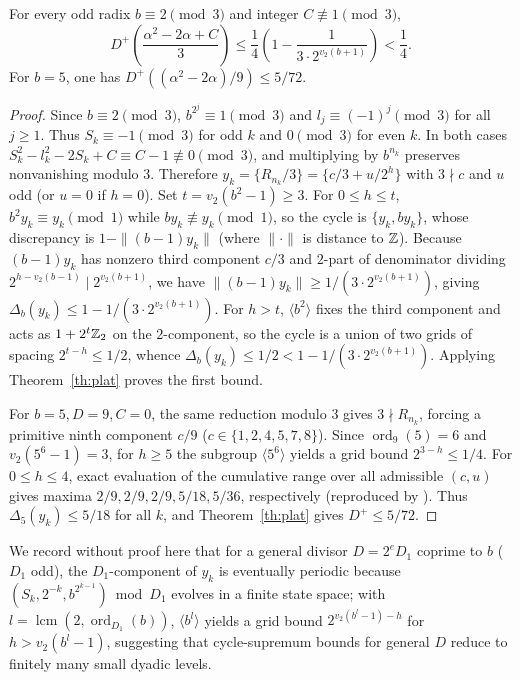 \documentclass[11pt]{article}
\begin{document}
\begin{corollary}\label{th:quarter}
For every odd radix $b\equiv2\pmod3$ and integer $C\not\equiv1\pmod3$,
\[
 D^+\!\left(\frac{\alpha^2-2\alpha+C}{3}\right)
 \le \frac14\left(1-\frac{1}{3\cdot2^{v_2(b+1)}}\right)<\frac14.
\]
For $b=5$, one has $D^+((\alpha^2-2\alpha)/9)\le5/72$.
\end{corollary}
\begin{proof}
Since $b\equiv2\pmod3$, $b^{2^j}\equiv1\pmod3$ and $l_j\equiv(-1)^j\pmod3$ for all $j\ge1$. Thus $S_k\equiv-1\pmod3$ for odd $k$ and $0\pmod3$ for even $k$. In both cases $S_k^2-l_k^2-2S_k+C\equiv C-1\not\equiv0\pmod3$, and multiplying by $b^{n_k}$ preserves nonvanishing modulo $3$. Therefore $y_k=\{R_{n_k}/3\}=\{c/3+u/2^h\}$ with $3\nmid c$ and $u$ odd (or $u=0$ if $h=0$). Set $t=v_2(b^2-1)\ge3$. For $0\le h\le t$, $b^2 y_k\equiv y_k\pmod1$ while $b y_k\not\equiv y_k\pmod1$, so the cycle is $\{y_k,b y_k\}$, whose discrepancy is $1-\|(b-1)y_k\|$ (where $\|\cdot\|$ is distance to $\mathbb Z$). Because $(b-1)y_k$ has nonzero third component $c/3$ and $2$-part of denominator dividing $2^{h-v_2(b-1)}\mid 2^{v_2(b+1)}$, we have $\|(b-1)y_k\|\ge1/(3\cdot2^{v_2(b+1)})$, giving $\Delta_b(y_k)\le1-1/(3\cdot2^{v_2(b+1)})$. For $h>t$, $\langle b^2\rangle$ fixes the third component and acts as $1+2^t\mathbb Z_2$ on the $2$-component, so the cycle is a union of two grids of spacing $2^{t-h}\le1/2$, whence $\Delta_b(y_k)\le1/2<1-1/(3\cdot2^{v_2(b+1)})$. Applying Theorem~\ref{th:plat} proves the first bound.

For $b=5,D=9,C=0$, the same reduction modulo $3$ gives $3\nmid R_{n_k}$, forcing a primitive ninth component $c/9$ ($c\in\{1,2,4,5,7,8\}$). Since $\operatorname{ord}_9(5)=6$ and $v_2(5^6-1)=3$, for $h\ge5$ the subgroup $\langle5^6\rangle$ yields a grid bound $2^{3-h}\le1/4$. For $0\le h\le4$, exact evaluation of the cumulative range over all admissible $(c,u)$ gives maxima $2/9,2/9,2/9,5/18,5/36$, respectively (reproduced by ). Thus $\Delta_5(y_k)\le5/18$ for all $k$, and Theorem~\ref{th:plat} gives $D^+\le5/72$.
\end{proof}

\begin{remark}
We record without proof here that for a general divisor $D=2^e D_1$ coprime to $b$ ($D_1$ odd), the $D_1$-component of $y_k$ is eventually periodic because $(S_k,2^{-k},b^{2^{k-1}})\bmod D_1$ evolves in a finite state space; with $l=\operatorname{lcm}(2,\operatorname{ord}_{D_1}(b))$, $\langle b^l\rangle$ yields a grid bound $2^{v_2(b^l-1)-h}$ for $h>v_2(b^l-1)$, suggesting that cycle-supremum bounds for general $D$ reduce to finitely many small dyadic levels.
\end{remark}
\end{document}
